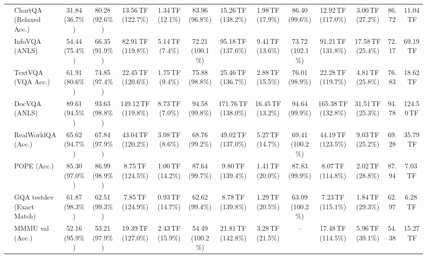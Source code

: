 \begin{table}[t]
\begin{center}
\begin{small}
\begin{sc}
{\begin{tabular}{llcccccccccccc}
\midrule\midrule
{}
& ChartQA (Relaxed Acc.) & 31.84 (36.7\%) & 80.28 (92.6\%) & 13.56\,TF (122.7\%) & 1.34\,TF (12.1\%) & 83.96 (96.8\%) & 15.26\,TF (138.2\%) & 1.98\,TF (17.9\%) & 86.40 (99.6\%) & 12.92\,TF (117.0\%) & 3.00\,TF (27.2\%) & 86.72 & 11.04\,TF \\
& InfoVQA (ANLS) & 54.44 (75.4\%) & 66.35 (91.9\%) & 82.91\,TF (119.8\%) & 5.14\,TF (7.4\%) & 72.21 (100.1\%) & 95.18\,TF (137.6\%) & 9.41\,TF (13.6\%) & 73.72 (102.1\%) & 91.21\,TF (131.8\%) & 17.58\,TF (25.4\%) & 72.17 & 69.19\,TF \\
& TextVQA (VQA Acc.) & 61.91 (80.6\%) & 74.85 (97.4\%) & 22.45\,TF (120.6\%) & 1.75\,TF (9.4\%) & 75.88 (98.8\%) & 25.46\,TF (136.7\%) & 2.88\,TF (15.5\%) & 76.01 (98.9\%) & 22.28\,TF (119.7\%) & 4.81\,TF (25.8\%) & 76.83 & 18.62\,TF \\
& DocVQA (ANLS) & 89.61 (94.5\%) & 93.63 (98.8\%) & 149.12\,TF (119.8\%) & 8.73\,TF (7.0\%) & 94.58 (99.8\%) & 171.76\,TF (138.0\%) & 16.45\,TF (13.2\%) & 94.64 (99.9\%) & 165.38\,TF (132.8\%) & 31.51\,TF (25.3\%) & 94.78 & 124.50\,TF \\
& RealWorldQA (Acc.) & 65.62 (94.7\%) & 67.84 (97.9\%) & 43.04\,TF (120.2\%) & 3.08\,TF (8.6\%) & 68.76 (99.2\%) & 49.02\,TF (137.0\%) & 5.27\,TF (14.7\%) & 69.41 (100.2\%) & 44.19\,TF (123.5\%) & 9.03\,TF (25.2\%) & 69.28 & 35.79\,TF \\
& POPE (Acc.) & 85.30 (97.0\%) & 86.99 (98.9\%) & 8.75\,TF (124.5\%) & 1.00\,TF (14.2\%) & 87.64 (99.7\%) & 9.80\,TF (139.4\%) & 1.41\,TF (20.0\%) & 87.83 (99.9\%) & 8.07\,TF (114.8\%) & 2.02\,TF (28.8\%) & 87.94 & 7.03\,TF \\
& GQA testdev (Exact Match) & 61.87 (98.3\%) & 62.51 (99.3\%) & 7.85\,TF (124.9\%) & 0.93\,TF (14.7\%) & 62.62 (99.4\%) & 8.78\,TF (139.8\%) & 1.29\,TF (20.5\%) & 63.09 (100.2\%) & 7.23\,TF (115.1\%) & 1.84\,TF (29.3\%) & 62.97 & 6.28\,TF \\
& MMMU val (Acc.) & 52.16 (95.9\%) & 53.21 (97.9\%) & 19.39\,TF (127.0\%) & 2.43\,TF (15.9\%) & 54.49 (100.2\%) & 21.81\,TF (142.8\%) & 3.28\,TF (21.5\%) & -- & 17.48\,TF (114.5\%) & 5.96\,TF (39.1\%) & 54.38 & 15.27\,TF \\

\end{tabular}}
\end{sc}
\end{small}
\end{center}
\end{table}
